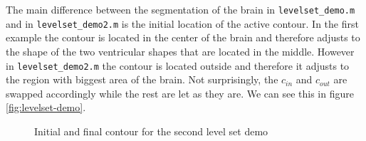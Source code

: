 The main difference between the segmentation of the brain in \texttt{levelset\_demo.m} and in \texttt{levelset\_demo2.m} is the initial location of the active contour. In the first example the contour is located in the center of the brain and therefore adjusts to the shape of the two ventricular shapes that are located in the middle. However in \texttt{levelset\_demo2.m} the contour is located outside and therefore it adjusts to the region with biggest area of the brain. Not surprisingly, the $ c_{in} $ and $ c_{out} $ are swapped accordingly while the rest are let as they are. We can see this in figure \ref{fig:levelset-demo}.

\begin{figure}[!hbt]
\centering   


\caption{Initial and final contour for the second level set demo}
\label{fig:levelset-demo2}
\end{figure}